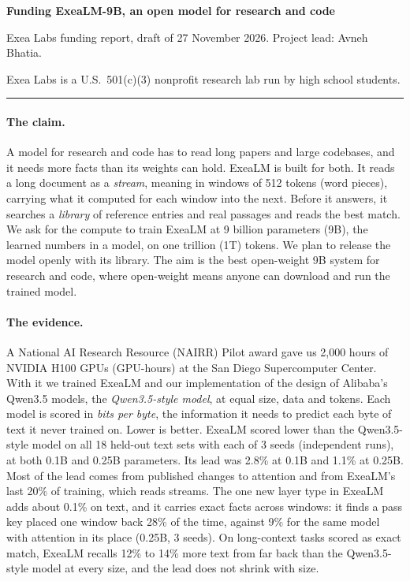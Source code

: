 \documentclass[11pt,letterpaper]{article}
\begin{document}
\thispagestyle{fancy}
{\LARGE\bfseries Funding ExeaLM-9B, an open model for research and code\par}
\vspace{5pt}
{\normalsize Exea Labs funding report, draft of 27 November 2026. Project lead: Avneh Bhatia.\par}
{\normalsize\color{ink2} Exea Labs is a U.S.\ 501(c)(3) nonprofit research lab run by high school students.\par}
\vspace{4pt}\hrule\vspace{2pt}

\paragraph{The claim.}
A model for research and code has to read long papers and large codebases, and it needs more facts than its weights can hold.
ExeaLM is built for both.
It reads a long document as a \emph{stream}, meaning in windows of 512 tokens (word pieces), carrying what it computed for each window into the next.
Before it answers, it searches a \emph{library} of reference entries and real passages and reads the best match.
We ask for the compute to train ExeaLM at 9 billion parameters (9B), the learned numbers in a model, on one trillion (1T) tokens.
We plan to release the model openly with its library.
The aim is the best open-weight 9B system for research and code, where open-weight means anyone can download and run the trained model.

\paragraph{The evidence.}
A National AI Research Resource (NAIRR) Pilot award gave us 2,000 hours of NVIDIA H100 GPUs (GPU-hours) at the San Diego Supercomputer Center.
With it we trained ExeaLM and our implementation of the design of Alibaba's Qwen3.5 models, the \emph{Qwen3.5-style model}, at equal size, data and tokens.
Each model is scored in \emph{bits per byte}, the information it needs to predict each byte of text it never trained on.
Lower is better.
ExeaLM scored lower than the Qwen3.5-style model on all 18 held-out text sets with each of 3 seeds (independent runs), at both 0.1B and 0.25B parameters.
Its lead was 2.8\% at 0.1B and 1.1\% at 0.25B.
Most of the lead comes from published changes to attention and from ExeaLM's last 20\% of training, which reads streams.
The one new layer type in ExeaLM adds about 0.1\% on text, and it carries exact facts across windows: it finds a pass key placed one window back 28\% of the time, against 9\% for the same model with attention in its place (0.25B, 3 seeds).
On long-context tasks scored as exact match, ExeaLM recalls 12\% to 14\% more text from far back than the Qwen3.5-style model at every size, and the lead does not shrink with size.
\end{document}
